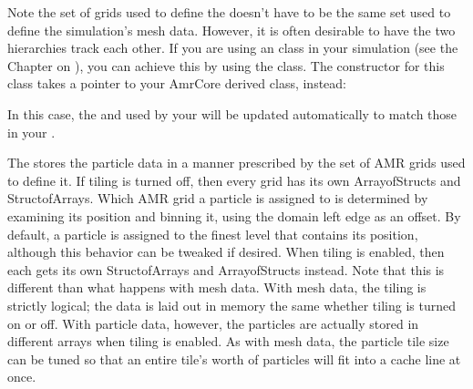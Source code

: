 \documentclass[letterpaper,10pt,english]{sphinxmanual}
\begin{document}
\sphinxAtStartPar
Note the set of grids used to define the  doesn’t have
to be the same set used to define the simulation’s mesh data. However, it is
often desirable to have the two hierarchies track each other. If you are using
an  class in your simulation (see the Chapter on
{\hyperref[\detokenize{AmrCore_Chapter:chap-amrcore}]{}}), you can achieve this by using the
 class. The constructor for this class takes a
pointer to your AmrCore derived class, instead:

\begin{sphinxVerbatim}[commandchars=\\\{\}]
  
\end{sphinxVerbatim}

\sphinxAtStartPar
In this case, the  and 
used by your  will be updated automatically to match
those in your .

\sphinxAtStartPar
The  stores the particle data in a manner prescribed by
the set of AMR grids used to define it. If tiling is turned off, then every
grid has its own Array\sphinxhyphen{}of\sphinxhyphen{}Structs and Struct\sphinxhyphen{}of\sphinxhyphen{}Arrays. Which AMR grid a
particle is assigned to is determined by examining its position and binning it,
using the domain left edge as an offset.  By default, a particle is assigned to
the finest level that contains its position, although this behavior can be
tweaked if desired.  When tiling is enabled, then each  gets its own
Struct\sphinxhyphen{}of\sphinxhyphen{}Arrays and Array\sphinxhyphen{}of\sphinxhyphen{}Structs instead. Note that this is different than
what happens with mesh data. With mesh data, the tiling is strictly logical;
the data is laid out in memory the same whether tiling is turned on or off.
With particle data, however, the particles are actually stored in different
arrays when tiling is enabled. As with mesh data, the particle tile size can be
tuned so that an entire tile’s worth of particles will fit into a cache line at
once.
\end{document}
